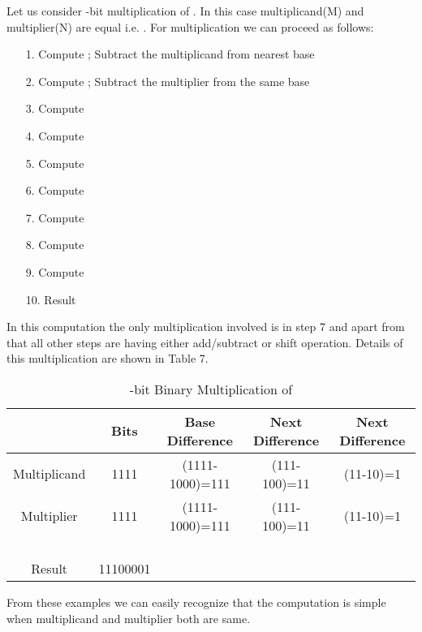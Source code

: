 \documentclass[conference]{IEEEtran}
\begin{document}
Let us consider -bit multiplication of . In this case multiplicand(M) and multiplier(N) are equal i.e. . For multiplication we can proceed as follows:
\begin{enumerate}
 \item[1.]  Compute ; Subtract the multiplicand from nearest base 
 \item[2.]  Compute ; Subtract the multiplier from the same base
 \item[3.]  Compute 
 \item[4.]  Compute  
 \item[5.]  Compute 
 \item[6.]  Compute 
 \item[7.]  Compute 
 \item[8.]  Compute 
 \item[9.]  Compute 
 \item[10.] Result  
\end{enumerate}
In this computation the only multiplication involved is in step 7 and apart from that all other steps are having either add/subtract or shift operation. Details of this multiplication are shown in Table 7.


\begin{table*}[ht]
\renewcommand{\arraystretch}{1.3}
\caption{-bit Binary Multiplication of }
\label{table 7}
\begin{center}
\begin{tabular}{|c| c| c| c| c|} 
\hline
 & Bits & Base Difference  & Next Difference & Next Difference  \\ [1ex] \hline\hline 
Multiplicand & 1111 & (1111-1000)=111 &(111-100)=11 & (11-10)=1  \\ \hline
Multiplier & 1111 & (1111-1000)=111 &(111-100)=11 & (11-10)=1  \\ \hline
 &  &  &  &   \\ \hline
 &  &  &  & \\ \hline
 &  &  &  & \\ \hline
 &  &  &  & \\ \hline
Result & 11100001 &  &  &   \\ [1ex] \hline

\end{tabular} 
\end{center}
\end{table*} 


From these examples we can easily recognize that the computation is simple when multiplicand and multiplier both are same. 
\end{document}
